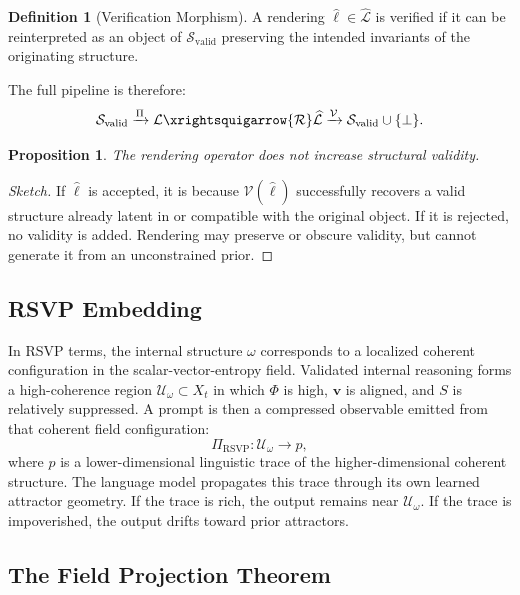 \documentclass[12pt, a4paper]{article}
\theoremstyle{plain}
\newtheorem{proposition}[theorem]{Proposition}
\theoremstyle{definition}
\newtheorem{definition}[theorem]{Definition}
\theoremstyle{remark}
\begin{document}
\begin{definition}[Verification Morphism]
A rendering $\hat{\ell} \in \widehat{\mathcal{L}}$ is verified if it can be reinterpreted as an object of $\mathcal{S}_{\mathrm{valid}}$ preserving the intended invariants of the originating structure.
\end{definition}

The full pipeline is therefore:
\[
\mathcal{S}_{\mathrm{valid}}
\xrightarrow{\Pi}
\mathcal{L}
\xrightsquigarrow{\mathcal{R}}
\widehat{\mathcal{L}}
\xrightarrow{\mathcal{V}}
\mathcal{S}_{\mathrm{valid}} \cup \{\bot\}.
\]

\begin{proposition}
The rendering operator does not increase structural validity.
\end{proposition}

\begin{proof}[Sketch]
If $\hat{\ell}$ is accepted, it is because $\mathcal{V}(\hat{\ell})$ successfully recovers a valid structure already latent in or compatible with the original object. If it is rejected, no validity is added. Rendering may preserve or obscure validity, but cannot generate it from an unconstrained prior.
\end{proof}

\subsection{RSVP Embedding}

In RSVP terms, the internal structure $\omega$ corresponds to a localized coherent configuration in the scalar-vector-entropy field. Validated internal reasoning forms a high-coherence region $\mathcal{U}_\omega \subset X_t$ in which $\Phi$ is high, $\mathbf{v}$ is aligned, and $S$ is relatively suppressed. A prompt is then a compressed observable emitted from that coherent field configuration:
\[
\Pi_{\mathrm{RSVP}} : \mathcal{U}_\omega \to p,
\]
where $p$ is a lower-dimensional linguistic trace of the higher-dimensional coherent structure. The language model propagates this trace through its own learned attractor geometry. If the trace is rich, the output remains near $\mathcal{U}_\omega$. If the trace is impoverished, the output drifts toward prior attractors.

\subsection{The Field Projection Theorem}
\end{document}
